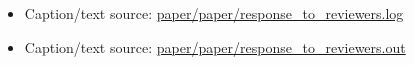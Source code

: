 \begin{itemize}[leftmargin=1.4em,noitemsep]
\item Caption/text source: \begingroup\scriptsize\url{paper/paper/response_to_reviewers.log}\endgroup
\item Caption/text source: \begingroup\scriptsize\url{paper/paper/response_to_reviewers.out}\endgroup
\end{itemize}
